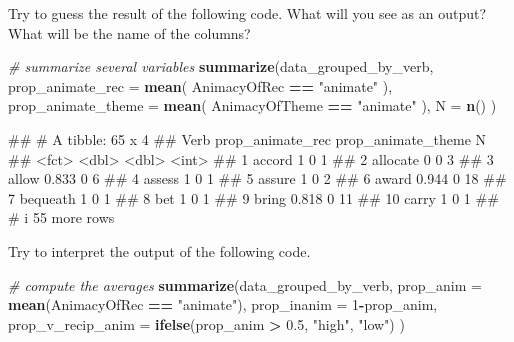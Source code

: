 \documentclass[
]{book}
\newenvironment{Shaded}{\begin{snugshade}}{\end{snugshade}}
\newcommand{\AttributeTok}[1]{\textcolor[rgb]{0.13,0.29,0.53}{#1}}
\newcommand{\CommentTok}[1]{\textcolor[rgb]{0.56,0.35,0.01}{\textit{#1}}}
\newcommand{\DecValTok}[1]{\textcolor[rgb]{0.00,0.00,0.81}{#1}}
\newcommand{\FloatTok}[1]{\textcolor[rgb]{0.00,0.00,0.81}{#1}}
\newcommand{\FunctionTok}[1]{\textcolor[rgb]{0.13,0.29,0.53}{\textbf{#1}}}
\newcommand{\NormalTok}[1]{#1}
\newcommand{\SpecialCharTok}[1]{\textcolor[rgb]{0.81,0.36,0.00}{\textbf{#1}}}
\newcommand{\StringTok}[1]{\textcolor[rgb]{0.31,0.60,0.02}{#1}}
\begin{document}
Try to guess the result of the following code. What will you see as an output? What will be the name of the columns?

\begin{Shaded}
\begin{Highlighting}[]
\CommentTok{\# summarize several variables}
\FunctionTok{summarize}\NormalTok{(data\_grouped\_by\_verb, }
          \AttributeTok{prop\_animate\_rec =} \FunctionTok{mean}\NormalTok{( AnimacyOfRec }\SpecialCharTok{==} \StringTok{"animate"}\NormalTok{ ),}
          \AttributeTok{prop\_animate\_theme =} \FunctionTok{mean}\NormalTok{( AnimacyOfTheme }\SpecialCharTok{==} \StringTok{"animate"}\NormalTok{ ),}
          \AttributeTok{N =} \FunctionTok{n}\NormalTok{()}
\NormalTok{          )}
\end{Highlighting}
\end{Shaded}

\begin{Shaded}
\begin{Highlighting}[]
\NormalTok{\#\# \# A tibble: 65 x 4}
\NormalTok{\#\#    Verb     prop\_animate\_rec prop\_animate\_theme     N}
\NormalTok{\#\#    \textless{}fct\textgreater{}               \textless{}dbl\textgreater{}              \textless{}dbl\textgreater{} \textless{}int\textgreater{}}
\NormalTok{\#\#  1 accord              1                      0     1}
\NormalTok{\#\#  2 allocate            0                      0     3}
\NormalTok{\#\#  3 allow               0.833                  0     6}
\NormalTok{\#\#  4 assess              1                      0     1}
\NormalTok{\#\#  5 assure              1                      0     2}
\NormalTok{\#\#  6 award               0.944                  0    18}
\NormalTok{\#\#  7 bequeath            1                      0     1}
\NormalTok{\#\#  8 bet                 1                      0     1}
\NormalTok{\#\#  9 bring               0.818                  0    11}
\NormalTok{\#\# 10 carry               1                      0     1}
\NormalTok{\#\# \# i 55 more rows}
\end{Highlighting}
\end{Shaded}

Try to interpret the output of the following code.

\begin{Shaded}
\begin{Highlighting}[]
\CommentTok{\# compute the averages}
\FunctionTok{summarize}\NormalTok{(data\_grouped\_by\_verb, }
          \AttributeTok{prop\_anim =} \FunctionTok{mean}\NormalTok{(AnimacyOfRec }\SpecialCharTok{==} \StringTok{"animate"}\NormalTok{),}
          \AttributeTok{prop\_inanim =} \DecValTok{1}\SpecialCharTok{{-}}\NormalTok{prop\_anim,}
          \AttributeTok{prop\_v\_recip\_anim =} \FunctionTok{ifelse}\NormalTok{(prop\_anim }\SpecialCharTok{\textgreater{}} \FloatTok{0.5}\NormalTok{, }\StringTok{"high"}\NormalTok{, }\StringTok{"low"}\NormalTok{)}
\NormalTok{          )}
\end{Highlighting}
\end{Shaded}
\end{document}
